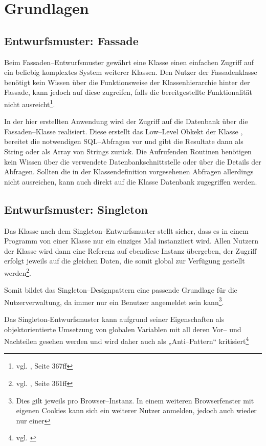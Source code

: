 \section{Grundlagen}

\subsection{Entwurfsmuster: Fassade}

Beim Fassaden--Entwurfsmuster gewährt eine Klasse einen einfachen Zugriff auf ein beliebig komplextes System weiterer Klassen. Den Nutzer der Fassadenklasse benötigt kein Wissen über die Funktionsweise der Klassenhierarchie hinter der Fassade, kann jedoch auf diese zugreifen, falls die bereitgestellte Funktionalität nicht ausreicht\footnote{vgl. \cite{Balzert}, Seite 367ff}.

In der hier erstellten Anwendung wird der Zugriff auf die Datenbank über die Fassaden--Klasse  realisiert. Diese erstellt das Low--Level Obkekt der Klasse , bereitet die notwendigen SQL--Abfragen vor und gibt die Resultate dann als String oder als Array von Strings zurück. Die Aufrufenden Routinen benötigen kein Wissen über die verwendete Datenbankschnittstelle oder über die Details der Abfragen. Sollten die in der Klassendefinition vorgesehenen Abfragen allerdings nicht ausreichen, kann auch direkt auf die Klasse Datenbank zugegriffen werden.

\subsection{Entwurfsmuster: Singleton}

Das Klasse nach dem Singleton--Entwurfsmuster stellt sicher, dass es in einem Programm von einer Klasse nur ein einziges Mal instanziiert wird. Allen Nutzern der Klasse wird dann eine Referenz auf ebendiese Instanz übergeben, der Zugriff erfolgt jeweils auf die gleichen Daten, die somit global zur Verfügung gestellt werden\footnote{vgl. \cite{Balzert}, Seite 361ff}.

Somit bildet das Singleton--Designpattern eine passende Grundlage für die Nutzerverwaltung, da immer nur ein Benutzer angemeldet sein kann\footnote{Dies gilt jeweils pro Browser--Instanz. In einem weiteren Browserfenster mit eigenen Cookies kann sich ein weiterer Nutzer anmelden, jedoch auch wieder nur einer}.

Das Singleton-Entwurfsmuster kann aufgrund seiner Eigenschaften als objektorientierte Umsetzung von globalen Variablen mit all deren Vor-- und Nachteilen gesehen werden und wird daher auch als „Anti--Pattern“ kritisiert\footnote{vgl. \cite{Hauer:singleton}}

